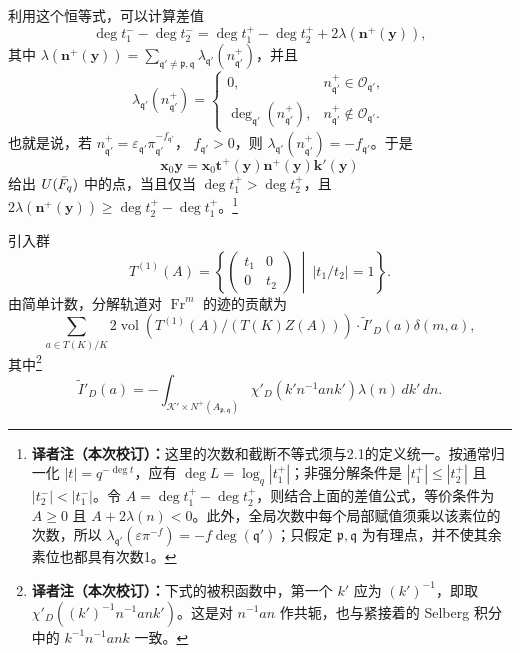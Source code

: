 利用这个恒等式，可以计算差值
\[
\deg t_1^- -\deg t_2^-=
\deg t_1^+-\deg t_2^++2\lambda(\boldsymbol n^+(\boldsymbol y)),
\]
其中 $\lambda(\boldsymbol n^+(\boldsymbol y))=
\sum_{\mathfrak q'\ne\mathfrak p,\mathfrak q}\lambda_{\mathfrak q'}(n_{\mathfrak q'}^+)$，并且
\[
\lambda_{\mathfrak q'}(n_{\mathfrak q'}^+)
=\begin{cases}0,&n_{\mathfrak q'}^+\in\mathcal O_{\mathfrak q'},\\
\deg_{\mathfrak q'}(n_{\mathfrak q'}^+),&n_{\mathfrak q'}^+\notin\mathcal O_{\mathfrak q'}.
\end{cases}
\]
也就是说，若 $n_{\mathfrak q'}^+=\varepsilon_{\mathfrak q'}\pi_{\mathfrak q'}^{-f_{\mathfrak q'}}$，
$f_{\mathfrak q'}>0$，则 $\lambda_{\mathfrak q'}(n_{\mathfrak q'}^+)=-f_{\mathfrak q'}$。于是
\[
\boldsymbol x_0\boldsymbol y=
\boldsymbol x_0\boldsymbol t^+(\boldsymbol y)\boldsymbol n^+(\boldsymbol y)
\boldsymbol k'(\boldsymbol y)
\]
给出 $U(\bar{F}_q)$ 中的点，当且仅当
$\deg t_1^+>\deg t_2^+$，且
$2\lambda(\boldsymbol n^+(\boldsymbol y))\geq\deg t_2^+-\deg t_1^+$。\footnote{\textbf{译者注（本次校订）：}这里的次数和截断不等式须与2.1的定义统一。按通常归一化 $|t|=q^{-\deg t}$，应有 $\deg L=\log_q|t_1^+|$；非强分解条件是 $|t_1^+|\leq|t_2^+|$ 且 $|t_2^-|<|t_1^-|$。令 $A=\deg t_1^+-\deg t_2^+$，则结合上面的差值公式，等价条件为 $A\geq0$ 且 $A+2\lambda(n)<0$。此外，全局次数中每个局部赋值须乘以该素位的次数，所以 $\lambda_{\mathfrak q'}(\varepsilon\pi^{-f})=-f\deg(\mathfrak q')$；只假定 $\mathfrak p,\mathfrak q$ 为有理点，并不使其余素位也都具有次数1。}


引入群
\[
T^{(1)}(A)=\left\{\begin{pmatrix}t_1&0\\0&t_2\end{pmatrix}\ \middle|\ |t_1/t_2|=1\right\}.
\]
由简单计数，分解轨道对 $\operatorname{Fr}^m$ 的迹的贡献为
\[
\sum_{a\in T(K)/K}
2\operatorname{vol}(T^{(1)}(A)/(T(K)Z(A)))\cdot\widetilde I'_D(a)\delta(m,a),
\]
其中\footnote{\textbf{译者注（本次校订）：}下式的被积函数中，第一个 $k'$ 应为 $(k')^{-1}$，即取 $\chi'_D((k')^{-1}n^{-1}ank')$。这是对 $n^{-1}an$ 作共轭，也与紧接着的 Selberg 积分中的 $k^{-1}n^{-1}ank$ 一致。}
\[
\widetilde I'_D(a)=-\int_{\mathcal K'\times N^+(A_{\mathfrak p,\mathfrak q})}
\chi'_D(k'n^{-1}ank')\lambda(n)\,dk'\,dn.
\]

